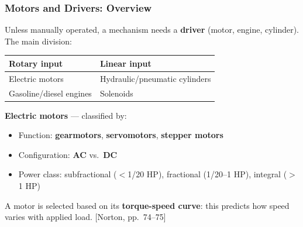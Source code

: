 \documentclass[10pt,aspectratio=43]{beamer}
\newcommand{\pref}[1]{\vfill\hfill{\scriptsize\color{gray}[Norton, pp.~#1]}}
\begin{document}
\begin{frame}
\frametitle{Motors and Drivers: Overview}

Unless manually operated, a mechanism needs a \textbf{driver} (motor, engine, cylinder). The main division:

\vspace{4pt}
\begin{center}
\begin{tabular}{l|l}
\toprule
\textbf{Rotary input} & \textbf{Linear input} \\
\midrule
Electric motors & Hydraulic/pneumatic cylinders \\
Gasoline/diesel engines & Solenoids \\
\bottomrule
\end{tabular}
\end{center}

\vspace{6pt}
\textbf{Electric motors} --- classified by:
\begin{itemize}
  \item Function: \textbf{gearmotors}, \textbf{servomotors}, \textbf{stepper motors}
  \item Configuration: \textbf{AC} vs.\ \textbf{DC}
  \item Power class: subfractional ($<$1/20 HP), fractional (1/20--1 HP), integral ($>$1 HP)
\end{itemize}

\vspace{4pt}
A motor is selected based on its \textbf{torque-speed curve}: this predicts how speed varies with applied load.
\pref{74--75}
\end{frame}
\end{document}
